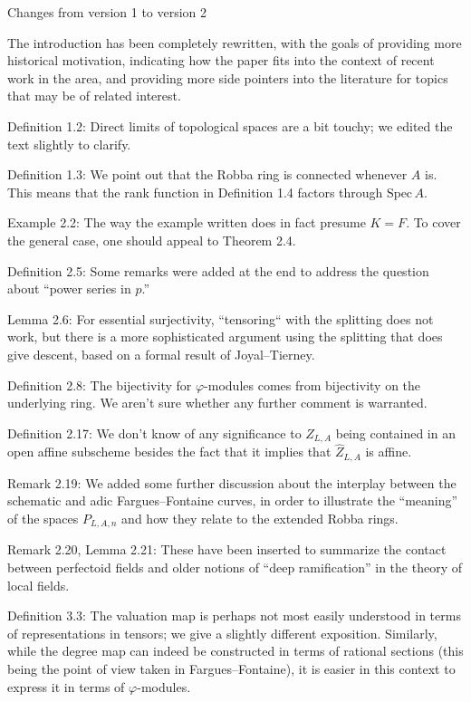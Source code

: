 \documentclass[12pt]{amsart}
\begin{document}
\begin{center}
Changes from version 1 to version 2
\end{center}

The introduction has been completely rewritten, with the goals of providing more historical motivation, indicating how the paper fits into the context of recent work in the area, and providing more side pointers into the literature for topics that may be of related interest.

Definition 1.2: Direct limits of topological spaces are a bit touchy; we edited the text slightly to clarify.

Definition 1.3: We point out that the Robba ring is connected whenever $A$ is. This means that the rank function in Definition 1.4 factors through $\mathrm{Spec}\, A$.

Example 2.2: The way the example written does in fact presume $K = F$. To cover the general case, one should appeal to Theorem 2.4.

Definition 2.5: Some remarks were added at the end to address the question about ``power series in $p$.''

Lemma 2.6: For essential surjectivity, ``tensoring`` with the splitting does not work, but there is a more sophisticated argument using the splitting that does give descent, based on a formal result of Joyal--Tierney.

Definition 2.8: The bijectivity for $\varphi$-modules comes from bijectivity on the underlying ring. We aren't sure whether any further comment is warranted.

Definition 2.17: We don't know of any significance to $Z_{L,A}$ being contained in an open affine subscheme besides the fact that it implies that $\widehat{Z}_{L,A}$ is affine.

Remark 2.19: We added some further discussion about the interplay between the schematic and adic Fargues--Fontaine curves, in order to illustrate the ``meaning'' of the spaces $P_{L,A,n}$ and how they relate to the extended Robba rings.

Remark 2.20, Lemma 2.21: These have been inserted to summarize the contact between perfectoid fields and older notions of ``deep ramification'' in the theory of local fields.

Definition 3.3: The valuation map is perhaps not most easily understood in terms of representations in tensors; we give a slightly different exposition. Similarly, while the degree map can indeed be constructed in terms of rational sections (this being the point of view taken in Fargues--Fontaine), it is easier in this context to express it in terms of $\varphi$-modules.
\end{document}
